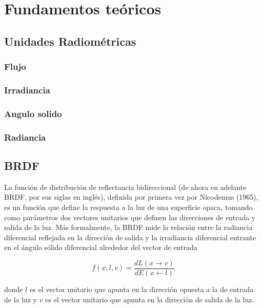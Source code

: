 \chapter{Fundamentos teóricos}

\section{Unidades Radiométricas}

\subsection{Flujo}

\subsection{Irradiancia}

\subsection{Angulo solido}

\subsection{Radiancia}

\clearpage

\section{BRDF}

La función de distribución de reflectancia bidireccional (de ahora en adelante BRDF, por sus siglas en inglés), definida por primera vez por Nicodemus (1965), es un función que define la respuesta a la luz de una superficie opaca, tomando como parámetros dos vectores unitarios que definen las direcciones de entrada y salida de la luz. Más formalmente, la BRDF mide la relación entre la radiancia diferencial reflejada en la dirección de salida y la irradiancia diferencial entrante en el ángulo sólido diferencial alrededor del vector de entrada

\begin{equation}
f(x, l, v)=\frac{dL(x \to v)}{dE(x \gets l)} 
\end{equation}

donde $l$ es el vector unitario que apunta en la dirección opuesta a la de entrada de la luz y $v$ es el vector unitario que apunta en la dirección de salida de la luz.

